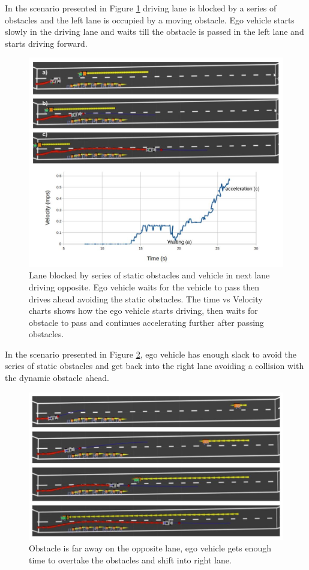 In the scenario presented in Figure \ref{series_obstacles} driving lane is blocked by a series of obstacles and the left lane is occupied by a moving obstacle. Ego vehicle starts slowly in the driving lane and waits till the obstacle is passed in the left lane and starts driving forward. 
\begin{figure}
    \centering
    \includegraphics[width=1.0\textwidth]{Images/evaluation/vehicle_opp_1.jpg}
    \caption{Lane blocked by series of static obstacles and vehicle in next lane driving opposite. Ego vehicle waits for the vehicle to pass then drives ahead avoiding the static obstacles. The time vs Velocity charts shows how the ego vehicle starts driving, then waits for obstacle to pass and continues accelerating further after passing obstacles.}
    \label{series_obstacles}
\end{figure}

In the scenario presented in Figure \ref{series_obstacles_2}, ego vehicle has enough slack to avoid the series of static obstacles and get back into the right lane avoiding a collision with the dynamic obstacle ahead. 

\begin{figure}
	\centering
	\includegraphics[width=1.0\textwidth]{Images/evaluation/vehicle_opp_2.jpg}
	\caption{Obstacle is far away on the opposite lane, ego vehicle gets enough time to overtake the obstacles and shift into right lane.}
	\label{series_obstacles_2}
\end{figure}


